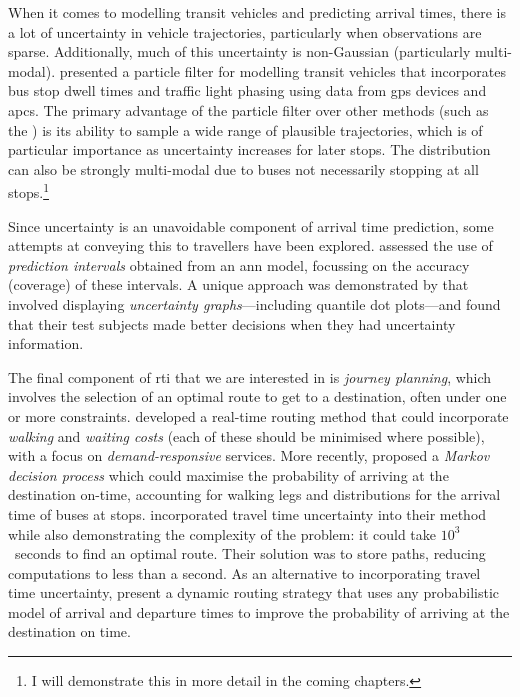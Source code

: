 When it comes to modelling transit vehicles and predicting arrival times, there is a lot of uncertainty in vehicle trajectories, particularly when observations are sparse. Additionally, much of this uncertainty is non-Gaussian (particularly multi-modal).  presented a particle filter for modelling transit vehicles that incorporates bus stop dwell times and traffic light phasing using data from \gls{gps} devices and \glspl{apc}. The primary advantage of the particle filter over other methods (such as the \kf{}) is its ability to sample a wide range of plausible trajectories, which is of particular importance as uncertainty increases for later stops. The distribution can also be strongly multi-modal due to buses not necessarily stopping at all stops.\footnote{I will demonstrate this in more detail in the coming chapters.}


Since uncertainty is an unavoidable component of arrival time prediction, some attempts at conveying this to travellers have been explored.  assessed the use of \emph{prediction intervals} obtained from an \gls{ann} model, focussing on the accuracy (coverage) of these intervals. A unique approach was demonstrated by \citet{Fernandes_2018} that involved displaying \emph{uncertainty graphs}---including quantile dot plots---and found that their test subjects made better decisions when they had uncertainty information.


The final component of \gls{rti} that we are interested in is \emph{journey planning}, which involves the selection of an optimal route to get to a destination, often under one or more constraints.  developed a real-time routing method that could incorporate \emph{walking} and \emph{waiting costs} (each of these should be minimised where possible), with a focus on \emph{demand-responsive} services. More recently, \citet{Hame_2013a,Hame_2013b} proposed a \emph{Markov decision process} which could maximise the probability of arriving at the destination on-time, accounting for walking legs and distributions for the arrival time of buses at stops.  \citet{Zheng_2016} incorporated travel time uncertainty into their method while also demonstrating the complexity of the problem:  it could take $10^3$~seconds to find an optimal route. Their solution was to store paths, reducing computations to less than a second. As an alternative to incorporating travel time uncertainty, \citet{Berczi_2017} present a dynamic routing strategy that uses any probabilistic model of arrival and departure times to improve the probability of arriving at the destination on time.


